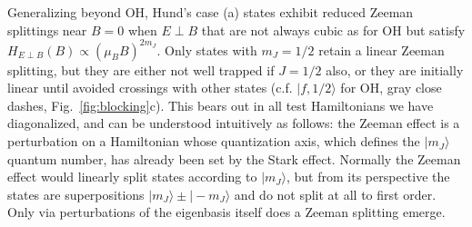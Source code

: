 \documentclass[%
 reprint,
 amsmath,amssymb,
 aps,
prl,
]{revtex4-1}
\newcommand{\epb}{{$E\!\perp\!B$}}
\newcommand{\epbm}{{E\!\perp\!B}}
\begin{document}



Generalizing beyond OH, Hund's case (a) states exhibit reduced Zeeman splittings near $B\!=\!0$ when \epb{} that are not always cubic as for OH but satisfy $H_\epbm(B)\propto (\mu_BB)^{2m_J}$. Only states with $m_J=1/2$ retain a linear Zeeman splitting, but they are either not well trapped if $J=1/2$ also, or they are initially linear until avoided crossings with other states (c.f. $|f,1/2\rangle$ for OH, gray close dashes, Fig.~\ref{fig:blocking}c). This bears out in all test Hamiltonians we have diagonalized, and can be understood intuitively as follows: the Zeeman effect is a perturbation on a Hamiltonian whose quantization axis, which defines the $|m_J\rangle$ quantum number, has already been set by the Stark effect. Normally the Zeeman effect would linearly split states according to $|m_J\rangle$, but from its perspective the states are superpositions $|m_J\rangle\pm|\!-\!m_J\rangle$ and do not split at all to first order. Only via perturbations of the eigenbasis itself does a Zeeman splitting emerge.
\end{document}

